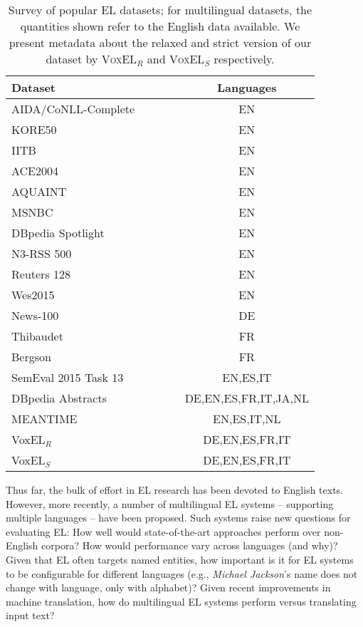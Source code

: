 \documentclass[sigconf]{acmart}
\begin{document}
\newcommand{\ccell}[1]{\multicolumn{1}{c}{#1}}
\begin{table}[tb!]
\centering

\caption{Survey of popular EL datasets; for multilingual datasets, the quantities shown refer to the English data available. We present metadata about the relaxed and strict version of our dataset by \textsc{VoxEL}$_R$ and \textsc{VoxEL}$_S$ respectively.}
\label{tab:datasets} 
\begin{tabular}{lc}
\toprule
\textbf{Dataset}~~~~~~~~~~~~~~~~~~ & \ccell{\textbf{Languages}}\\\midrule
AIDA/CoNLL-Complete~\cite{aida2011}&EN \\
KORE50~\cite{kore50}                &EN \\
IITB~\cite{IITB2009}                &EN \\
ACE2004~\cite{aquaint}              &EN\\
AQUAINT~\cite{aquaint}              &EN \\
MSNBC~\cite{cucerzan2007large}      &EN \\
DBpedia Spotlight
\cite{mendes2011dbpedia}            &EN \\
N3-RSS 500~\cite{n3}                &EN \\
Reuters 128~\cite{n3}               &EN \\
Wes2015~\cite{wes2015}              &EN \\\midrule
News-100~\cite{n3}                  &DE \\
Thibaudet~\cite{renden2016}         &FR \\
Bergson~\cite{renden2016}           &FR \\\midrule
SemEval 2015 
Task 13~\cite{moro2015semeval}      &EN,ES,IT \\
DBpedia Abstracts
~\cite{abstracts2016}               &DE,EN,ES,FR,IT,JA,NL \\
MEANTIME \cite{meantime2016}        &EN,ES,IT,NL \\
VoxEL$_R$                           &DE,EN,ES,FR,IT\\  
VoxEL$_S$                           &DE,EN,ES,FR,IT\\ 
\bottomrule
\end{tabular}
\end{table}

Thus far, the bulk of effort in EL research has been devoted to English texts. However, more recently, a number of multilingual EL systems -- supporting multiple languages -- have been proposed. Such systems raise new questions for evaluating EL: How well would state-of-the-art approaches perform over non-English corpora? How would performance vary across languages (and why)? Given that EL often targets named entities, how important is it for EL systems to be configurable for different languages (e.g., \textit{Michael Jackson}'s name does not change with language, only with alphabet)? Given recent improvements in machine translation, how do multilingual EL systems perform versus translating input text?
\end{document}
